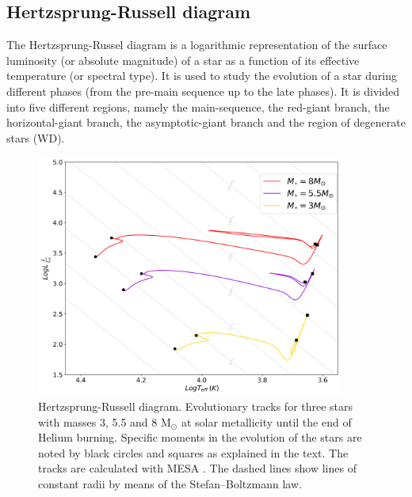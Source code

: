 \subsection{Hertzsprung-Russell diagram}

The Hertzsprung-Russel diagram is a logarithmic representation of the surface luminosity (or absolute magnitude) of a star as a function of its effective temperature (or spectral type). It is used to study the evolution of a star during different phases (from the pre-main sequence up to the late phases). It is divided into five different regions, namely the main-sequence, the red-giant branch, the horizontal-giant branch, the asymptotic-giant branch and the region of degenerate stars (WD). 

\begin{figure}[H]
    \centering
    \includegraphics[width=0.9\textwidth]{Thesis/graphs/HR_inter_stars.pdf}
    \caption{Hertzsprung-Russell diagram. Evolutionary tracks for three stars with masses 3, 5.5 and 8 M$_{\odot}$ at solar metallicity until the end of Helium burning. Specific moments in the evolution of the stars are noted by black circles and squares as explained in the text. The tracks are calculated with MESA \citep{paxton2010modules,paxton2013modules,paxton2015modules,paxton2019modules}. The dashed lines show lines of constant radii by means of the Stefan–Boltzmann law.}
    \label{fig:HR_inter_stars}
\end{figure}
